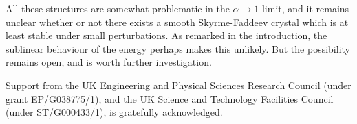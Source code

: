 \documentclass[5p]{elsarticle}
\begin{document}
All these structures are somewhat problematic in the $\alpha\to1$ limit, and
it remains unclear whether or not there exists a smooth Skyrme-Faddeev
crystal which is at least stable under small perturbations. As remarked in the
introduction, the sublinear behaviour of the energy perhaps makes this unlikely.
But the possibility remains open, and is worth further investigation.


\bigskip{}
Support from the UK Engineering and Physical Sciences Research Council
(under grant EP/G038775/1),
and the UK Science and Technology Facilities Council
(under ST/G000433/1), is gratefully acknowledged.

\end{document}
